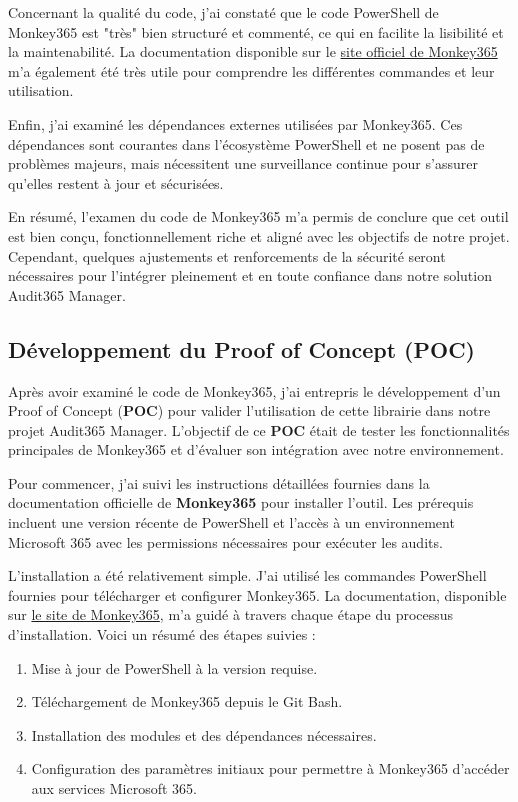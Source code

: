 Concernant la qualité du code, j'ai constaté que le code PowerShell de Monkey365 est "très" bien structuré et commenté, ce qui en facilite la lisibilité et la maintenabilité. La documentation disponible sur le \href{https://silverhack.github.io/monkey365/}{site officiel de Monkey365} m'a également été très utile pour comprendre les différentes commandes et leur utilisation.

Enfin, j'ai examiné les dépendances externes utilisées par Monkey365. Ces dépendances sont courantes dans l'écosystème PowerShell et ne posent pas de problèmes majeurs, mais nécessitent une surveillance continue pour s'assurer qu'elles restent à jour et sécurisées.

En résumé, l'examen du code de Monkey365 m'a permis de conclure que cet outil est bien conçu, fonctionnellement riche et aligné avec les objectifs de notre projet. Cependant, quelques ajustements et renforcements de la sécurité seront nécessaires pour l'intégrer pleinement et en toute confiance dans notre solution Audit365 Manager.

\subsection{Développement du Proof of Concept (POC)}

Après avoir examiné le code de Monkey365, j'ai entrepris le développement d'un Proof of Concept (\textbf{POC}) pour valider l'utilisation de cette librairie dans notre projet Audit365 Manager. L'objectif de ce \textbf{POC} était de tester les fonctionnalités principales de Monkey365 et d'évaluer son intégration avec notre environnement.

Pour commencer, j'ai suivi les instructions détaillées fournies dans la documentation officielle de \textbf{Monkey365} pour installer l'outil. Les prérequis incluent une version récente de PowerShell et l'accès à un environnement Microsoft 365 avec les permissions nécessaires pour exécuter les audits. 

L'installation a été relativement simple. J'ai utilisé les commandes PowerShell fournies pour télécharger et configurer Monkey365. La documentation, disponible sur \href{https://silverhack.github.io/monkey365/}{le site de Monkey365}, m'a guidé à travers chaque étape du processus d'installation. Voici un résumé des étapes suivies :

\begin{enumerate}
    \item Mise à jour de PowerShell à la version requise.
    \item Téléchargement de Monkey365 depuis le Git Bash.
    \item Installation des modules et des dépendances nécessaires.
    \item Configuration des paramètres initiaux pour permettre à Monkey365 d'accéder aux services Microsoft 365.
\end{enumerate}

